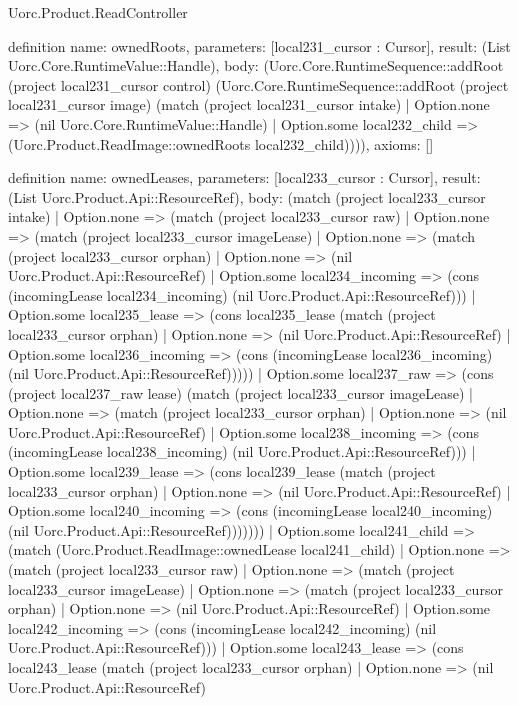 \begin{lexlean}{Uorc.Product.ReadController}
\begin{semanticmodule}
definition{
  name: ownedRoots,
  parameters: [local231_cursor : Cursor],
  result: (List Uorc.Core.RuntimeValue::Handle),
  body: (Uorc.Core.RuntimeSequence::addRoot (project local231_cursor control) (Uorc.Core.RuntimeSequence::addRoot (project local231_cursor image) (match (project local231_cursor intake)
    | Option.none => (nil Uorc.Core.RuntimeValue::Handle)
    | Option.some local232_child => (Uorc.Product.ReadImage::ownedRoots local232_child)))),
  axioms: []
}

definition{
  name: ownedLeases,
  parameters: [local233_cursor : Cursor],
  result: (List Uorc.Product.Api::ResourceRef),
  body: (match (project local233_cursor intake)
    | Option.none => (match (project local233_cursor raw)
      | Option.none => (match (project local233_cursor imageLease)
        | Option.none => (match (project local233_cursor orphan)
          | Option.none => (nil Uorc.Product.Api::ResourceRef)
          | Option.some local234_incoming => (cons (incomingLease local234_incoming) (nil Uorc.Product.Api::ResourceRef)))
        | Option.some local235_lease => (cons local235_lease (match (project local233_cursor orphan)
          | Option.none => (nil Uorc.Product.Api::ResourceRef)
          | Option.some local236_incoming => (cons (incomingLease local236_incoming) (nil Uorc.Product.Api::ResourceRef)))))
      | Option.some local237_raw => (cons (project local237_raw lease) (match (project local233_cursor imageLease)
        | Option.none => (match (project local233_cursor orphan)
          | Option.none => (nil Uorc.Product.Api::ResourceRef)
          | Option.some local238_incoming => (cons (incomingLease local238_incoming) (nil Uorc.Product.Api::ResourceRef)))
        | Option.some local239_lease => (cons local239_lease (match (project local233_cursor orphan)
          | Option.none => (nil Uorc.Product.Api::ResourceRef)
          | Option.some local240_incoming => (cons (incomingLease local240_incoming) (nil Uorc.Product.Api::ResourceRef)))))))
    | Option.some local241_child => (match (Uorc.Product.ReadImage::ownedLease local241_child)
      | Option.none => (match (project local233_cursor raw)
        | Option.none => (match (project local233_cursor imageLease)
          | Option.none => (match (project local233_cursor orphan)
            | Option.none => (nil Uorc.Product.Api::ResourceRef)
            | Option.some local242_incoming => (cons (incomingLease local242_incoming) (nil Uorc.Product.Api::ResourceRef)))
          | Option.some local243_lease => (cons local243_lease (match (project local233_cursor orphan)
            | Option.none => (nil Uorc.Product.Api::ResourceRef)
}
\end{semanticmodule}
\end{lexlean}
